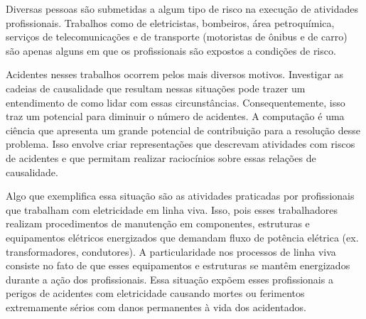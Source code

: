 Diversas pessoas são submetidas a algum tipo de risco na execução de atividades profissionais. Trabalhos como de eletricistas, bombeiros, área petroquímica, serviços de telecomunicações e de transporte (motoristas de ônibus e de carro) são apenas alguns em que os profissionais são expostos a condições de risco.

Acidentes nesses trabalhos ocorrem pelos mais diversos motivos. Investigar as cadeias de causalidade que resultam nessas situações pode trazer um entendimento de como lidar com essas circunstâncias. Consequentemente, isso traz um potencial para diminuir o número de acidentes. A computação é uma ciência que apresenta um grande potencial de contribuição para a resolução desse problema. Isso envolve criar representações que descrevam atividades com riscos de acidentes e que permitam realizar raciocínios sobre essas relações de causalidade.

Algo que exemplifica essa situação são as atividades praticadas por profissionais que trabalham com eletricidade em linha viva. Isso, pois esses trabalhadores realizam procedimentos de manutenção em componentes, estruturas e equipamentos elétricos energizados que demandam fluxo de potência elétrica (ex. transformadores, condutores). A particularidade nos processos de linha viva consiste no fato de que esses equipamentos e estruturas se mantêm energizados durante a ação dos profissionais. Essa situação expõem esses profissionais a perigos de acidentes com eletricidade causando mortes ou ferimentos extremamente sérios com danos permanentes à vida dos acidentados.  